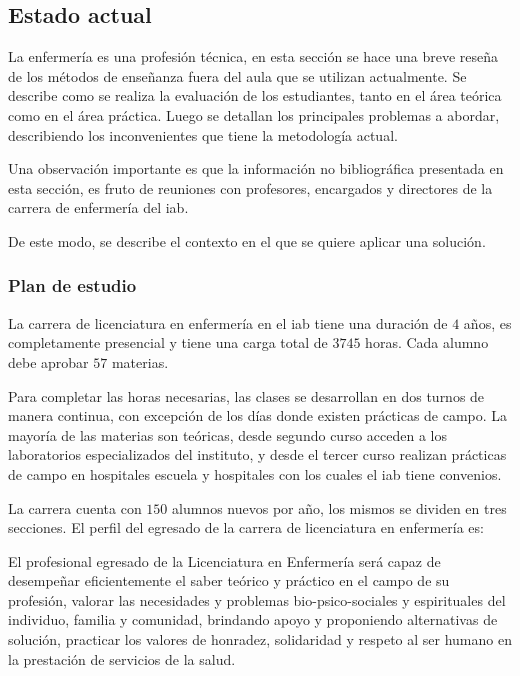 
\subsection{Estado actual}

La enfermería es una profesión técnica, en esta sección se hace una breve reseña
de los métodos de enseñanza fuera del aula que se utilizan actualmente. Se
describe como se realiza la evaluación de los estudiantes, tanto en el área
teórica como en el área práctica. Luego se detallan los principales problemas a
abordar, describiendo los inconvenientes que tiene la metodología actual.

Una observación importante es que la información no bibliográfica presentada en
esta sección, es fruto de reuniones con profesores, encargados y directores de
la carrera de enfermería del \Gls{iab}.

De este modo, se describe el contexto en el que se quiere aplicar una solución.


\subsubsection{Plan de estudio}
\label{sec:plan_estudio}

La carrera de licenciatura en enfermería en el \Gls{iab} tiene una duración de $4$
años, es completamente presencial y tiene una carga total de $3745$
horas. Cada alumno debe aprobar $57$ materias.

Para completar las horas necesarias, las clases se desarrollan en 
dos turnos de manera continua, con excepción de los días donde existen
prácticas de campo. La mayoría de las materias son teóricas, desde segundo curso
acceden a los laboratorios especializados del instituto, y desde el tercer curso
realizan prácticas de campo en hospitales escuela y hospitales con los cuales el
\Gls{iab} tiene convenios.

La carrera cuenta con $150$ alumnos nuevos por año, los mismos se dividen en tres secciones. 
El perfil del egresado de la carrera de licenciatura en enfermería 
es\cite{iab:enfermeria}:

\begin{displayquote}

El profesional egresado de la Licenciatura en Enfermería será capaz de
desempeñar eficientemente el saber teórico y práctico en el campo de su
profesión, valorar las necesidades y problemas bio-psico-sociales y espirituales
del individuo, familia y comunidad, brindando apoyo y proponiendo alternativas
de solución, practicar los valores de honradez, solidaridad y respeto al ser
humano en la prestación de servicios de la salud.

\end{displayquote}

